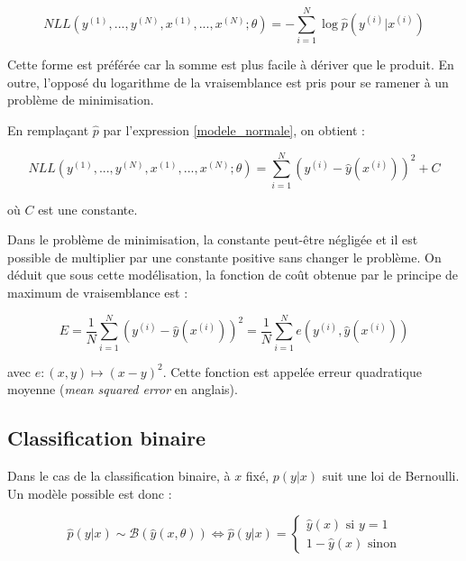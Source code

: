 \documentclass{report}
\begin{document}
\begin{equation}
NLL(y^{(1)}, ..., y^{(N)}, x^{(1)}, ..., x^{(N)}; \theta) = -\sum_{i=1}^{N}{\log{\hat{p}(y^{(i)}|x^{(i)})}}
\end{equation}

Cette forme est préférée car la somme est plus facile à dériver que le produit. En outre, l'opposé du logarithme de la vraisemblance est pris pour se ramener à un problème de minimisation.

En remplaçant $\hat{p}$ par l'expression \ref{modele_normale}, on obtient :

\begin{equation}
NLL(y^{(1)}, ..., y^{(N)}, x^{(1)}, ..., x^{(N)}; \theta) = \sum_{i=1}^{N}{(y^{(i)} - \hat{y}(x^{(i)}))^2}+C
\end{equation}

où $C$ est une constante.

Dans le problème de minimisation, la constante peut-être négligée et il est possible de multiplier par une constante positive sans changer le problème. On déduit que sous cette modélisation, la fonction de coût obtenue par le principe de maximum de vraisemblance est :

\begin{equation}
E = \frac{1}{N}\sum_{i=1}^{N}{(y^{(i)} - \hat{y}(x^{(i)}))^2} = \frac{1}{N}\sum_{i=1}^{N}{e(y^{(i)}, \hat{y}(x^{(i)}))}
\end{equation}

avec $e : (x, y) \mapsto (x - y)^2$. Cette fonction est appelée erreur quadratique moyenne (\textit{mean squared error} en anglais).

\subsection{Classification binaire}

Dans le cas de la classification binaire, à $x$ fixé, $p(y|x)$ suit une loi de Bernoulli. Un modèle possible est donc :

\begin{equation}
\hat{p}(y|x) \sim \mathcal{B}(\hat{y}(x, \theta)) \Leftrightarrow \hat{p}(y|x) = 
\left\{
    \begin{array}{ll}
        \hat{y}(x) \text{ si } y = 1 \\
        1 - \hat{y}(x) \text{ sinon}
    \end{array}
\right.
\label{modele_bernoulli}
\end{equation}
\end{document}
